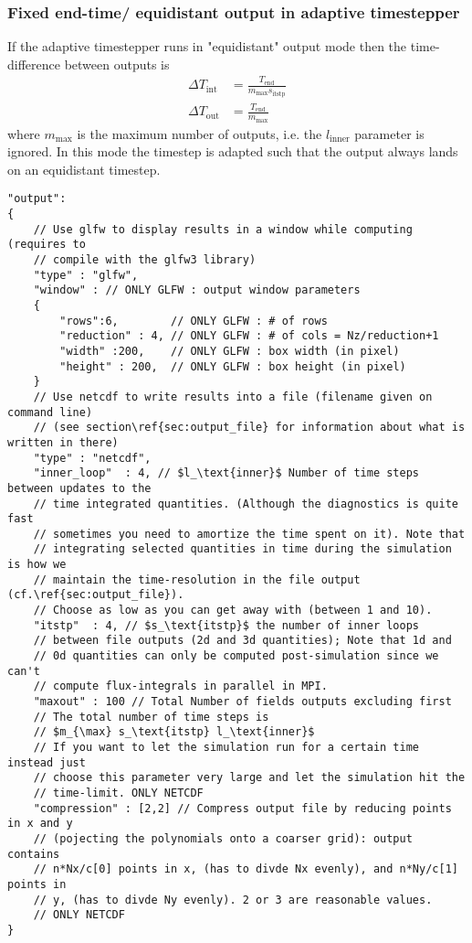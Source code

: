 \subsubsection{ Fixed end-time/ equidistant output in adaptive timestepper}
If the adaptive timestepper runs in "equidistant" output mode then the time-
difference between outputs is
\begin{align}
    \Delta T_\text{int} &= \frac{T_\text{end} }{ m_\text{max} s_\text{itstp}} \\
    \Delta T_\text{out} &= \frac{T_\text{end} }{ m_\text{max}}
\end{align}
where $m_{\max}$ is the maximum number of outputs,
i.e. the $l_\text{inner}$ parameter is ignored.
In this mode the timestep is adapted such that the output always lands on an
equidistant timestep.

\begin{verbatim}
"output":
{
    // Use glfw to display results in a window while computing (requires to
    // compile with the glfw3 library)
    "type" : "glfw",
    "window" : // ONLY GLFW : output window parameters
    {
        "rows":6,        // ONLY GLFW : # of rows
        "reduction" : 4, // ONLY GLFW : # of cols = Nz/reduction+1
        "width" :200,    // ONLY GLFW : box width (in pixel)
        "height" : 200,  // ONLY GLFW : box height (in pixel)
    }
    // Use netcdf to write results into a file (filename given on command line)
    // (see section\ref{sec:output_file} for information about what is written in there)
    "type" : "netcdf",
    "inner_loop"  : 4, // $l_\text{inner}$ Number of time steps between updates to the
    // time integrated quantities. (Although the diagnostics is quite fast
    // sometimes you need to amortize the time spent on it). Note that
    // integrating selected quantities in time during the simulation is how we
    // maintain the time-resolution in the file output (cf.\ref{sec:output_file}).
    // Choose as low as you can get away with (between 1 and 10).
    "itstp"  : 4, // $s_\text{itstp}$ the number of inner loops
    // between file outputs (2d and 3d quantities); Note that 1d and
    // 0d quantities can only be computed post-simulation since we can't
    // compute flux-integrals in parallel in MPI.
    "maxout" : 100 // Total Number of fields outputs excluding first
    // The total number of time steps is
    // $m_{\max} s_\text{itstp} l_\text{inner}$
    // If you want to let the simulation run for a certain time instead just
    // choose this parameter very large and let the simulation hit the
    // time-limit. ONLY NETCDF
    "compression" : [2,2] // Compress output file by reducing points in x and y
    // (pojecting the polynomials onto a coarser grid): output contains
    // n*Nx/c[0] points in x, (has to divde Nx evenly), and n*Ny/c[1] points in
    // y, (has to divde Ny evenly). 2 or 3 are reasonable values.
    // ONLY NETCDF
}
\end{verbatim}

